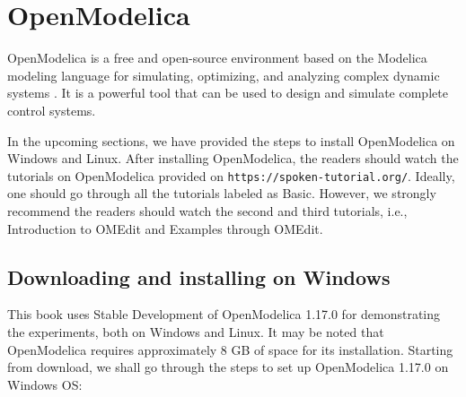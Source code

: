 \begin{juliacode}
      \label{julia:test-firmware}
      
\end{juliacode}






\section{OpenModelica}
\label{sec:OpenModelica-start}
OpenModelica is a free and open-source environment based on the Modelica modeling language 
for simulating, optimizing, and analyzing complex dynamic systems \cite{om-ref}.
It is a powerful tool that can be used to design and simulate complete control systems. 

In the upcoming sections, we have provided the steps to install OpenModelica on Windows and Linux. 
After installing OpenModelica, the readers should watch the tutorials on OpenModelica provided on 
{\tt https://spoken-tutorial.org/}. Ideally, one should go through all the tutorials labeled as Basic. 
However, we strongly recommend the readers should watch the second and third tutorials, i.e., 
Introduction to OMEdit and Examples through OMEdit.


\subsection{Downloading and installing on Windows} \label{openmodelica-install-windows}
This book uses Stable Development of OpenModelica 1.17.0 for demonstrating 
the experiments, both on Windows and Linux. It may be noted that 
OpenModelica requires approximately 8 GB of space for its installation. 
Starting from download, we shall go through the steps to set up OpenModelica 
1.17.0 on Windows OS:

